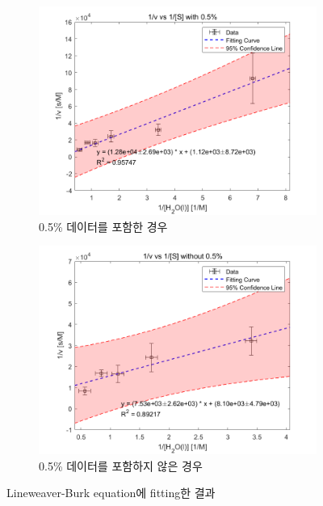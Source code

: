 \documentclass[%
 reprint,
 amsmath,amssymb,
 aps,
]{revtex4-2}
\begin{document}
\begin{figure}[htbp]
	\begin{subfigure}{0.4\textwidth}
		\includegraphics[width = 1.0\linewidth]{TOT_w_05.png}%
		\caption{\label{fig:TOT_w_05}0.5\% 데이터를 포함한 경우}
	\end{subfigure}
	\begin{subfigure}{0.4\textwidth}
		\includegraphics[width = 1.0\linewidth]{TOT_wo_05.png}%
		\caption{\label{fig:TOT_wo_05}0.5\% 데이터를 포함하지 않은 경우}
	\end{subfigure}
	\caption{\label{fig:TOT}Lineweaver-Burk equation에 fitting한 결과}
\end{figure}
\end{document}

